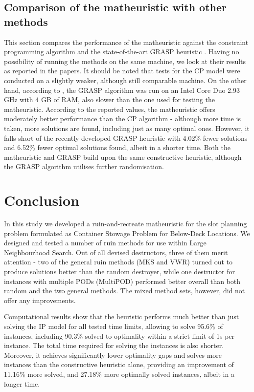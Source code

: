 \documentclass[preprint,11pt,3p]{elsarticle}
\begin{document}
\subsection{Comparison of the matheuristic with other methods}
This section compares the performance of the matheuristic against the constraint programming algorithm \cite{DJJRA12} and the state-of-the-art GRASP heuristic \cite{PPAV16}. Having no possibility of running the methods on the same machine, we look at their results as reported in the papers. It should be noted that tests for the CP model were conducted on a slightly weaker, although still comparable machine. On the other hand, according to \cite{PPAV16}, the GRASP algorithm was run on an Intel Core Duo 2.93 GHz with 4 GB of RAM, also slower than the one used for testing the matheuristic. According to the reported values, the matheuristic offers moderately better performance than the CP algorithm - although more time is taken, more solutions are found, including just as many optimal ones. However, it falls short of the recently developed GRASP heuristic with 4.02\% fewer solutions and 6.52\% fewer optimal solutions found, albeit in a shorter time. Both the matheuristic and GRASP build upon the same constructive heuristic, although the GRASP algorithm utilises further randomisation.

\section{Conclusion}
\label{sec:Conclusion}
In this study we developed a ruin-and-recreate matheuristic for the slot planning problem formulated as Container Stowage Problem for Below-Deck Locations. We designed and tested a number of ruin methods for use within Large Neighbourhood Search. Out of all devised destructors, three of them merit attention - two of the general ruin methods (MKS and VWR) turned out to produce solutions better than the random destroyer, while one destructor for instances with multiple PODs (MultiPOD) performed better overall than both random and the two general methods. The mixed method sets, however, did not offer any improvements.

Computational results show that the heuristic performs much better than just solving the IP model for all tested time limits, allowing to solve 95.6\% of instances, including 90.3\% solved to optimality within a strict limit of 1s per instance. The total time required for solving the instances is also shorter. Moreover, it achieves significantly lower optimality gaps and solves more instances than the constructive heuristic alone, providing an improvement of 11.16\% more solved, and 27.18\% more optimally solved instances, albeit in a longer time.
\end{document}
